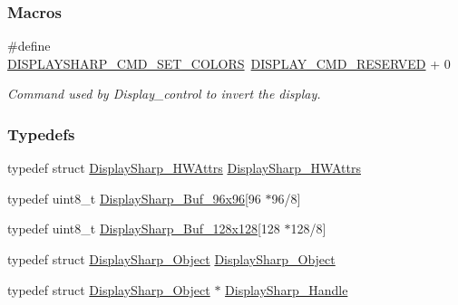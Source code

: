 \subsubsection*{Macros}
\begin{DoxyCompactItemize}
\item 
\#define \hyperlink{group___d_i_s_p_l_a_y___c_m_d_ga27b9623d9abc7aa7eeae74ea7d77cd0f}{D\+I\+S\+P\+L\+A\+Y\+S\+H\+A\+R\+P\+\_\+\+C\+M\+D\+\_\+\+S\+E\+T\+\_\+\+C\+O\+L\+O\+R\+S}~\hyperlink{group___d_i_s_p_l_a_y___c_o_n_t_r_o_l_ga99c2401cd11ea3b49e5e3e4ffac5c886}{D\+I\+S\+P\+L\+A\+Y\+\_\+\+C\+M\+D\+\_\+\+R\+E\+S\+E\+R\+V\+E\+D} + 0
\begin{DoxyCompactList}\small\item\em Command used by Display\+\_\+control to invert the display. \end{DoxyCompactList}\end{DoxyCompactItemize}
\subsubsection*{Typedefs}
\begin{DoxyCompactItemize}
\item 
typedef struct \hyperlink{struct_display_sharp___h_w_attrs}{Display\+Sharp\+\_\+\+H\+W\+Attrs} \hyperlink{_display_sharp_8h_aa62462bfa240d8baa1496f068b9e6b72}{Display\+Sharp\+\_\+\+H\+W\+Attrs}
\item 
typedef uint8\+\_\+t \hyperlink{_display_sharp_8h_a252644281442bd3d66e41b9f4bf668f3}{Display\+Sharp\+\_\+\+Buf\+\_\+96x96}\mbox{[}96 $\ast$96/8\mbox{]}
\item 
typedef uint8\+\_\+t \hyperlink{_display_sharp_8h_ad8ce0f227370642020f4950d846f099b}{Display\+Sharp\+\_\+\+Buf\+\_\+128x128}\mbox{[}128 $\ast$128/8\mbox{]}
\item 
typedef struct \hyperlink{struct_display_sharp___object}{Display\+Sharp\+\_\+\+Object} \hyperlink{_display_sharp_8h_a5c889fe79898e80e246386ed4b147a42}{Display\+Sharp\+\_\+\+Object}
\item 
typedef struct \hyperlink{struct_display_sharp___object}{Display\+Sharp\+\_\+\+Object} $\ast$ \hyperlink{_display_sharp_8h_aa5921b9b7a4e44e010d86b858f3de52d}{Display\+Sharp\+\_\+\+Handle}
\end{DoxyCompactItemize}

